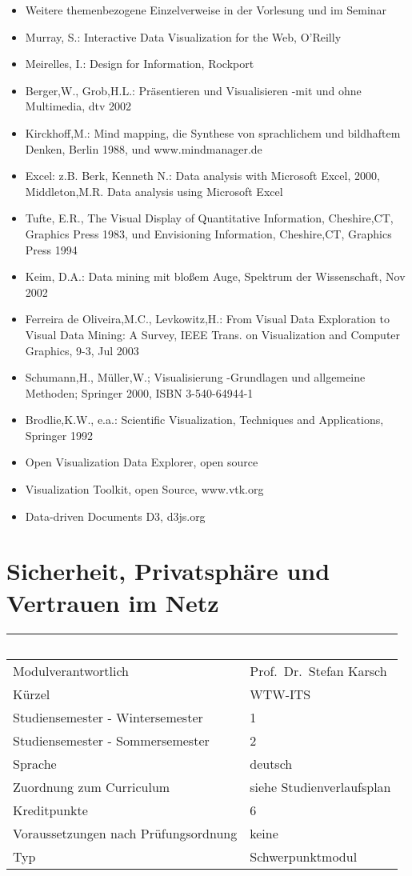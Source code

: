 \begin{itemize}
\item
  Weitere themenbezogene Einzelverweise in der Vorlesung und im Seminar
\item
  Murray, S.: Interactive Data Visualization for the Web, O'Reilly
\item
  Meirelles, I.: Design for Information, Rockport
\item
  Berger,W., Grob,H.L.: Präsentieren und Visualisieren -mit und ohne
  Multimedia, dtv 2002
\item
  Kirckhoff,M.: Mind mapping, die Synthese von sprachlichem und
  bildhaftem Denken, Berlin 1988, und www.mindmanager.de
\item
  Excel: z.B. Berk, Kenneth N.: Data analysis with Microsoft Excel,
  2000, Middleton,M.R. Data analysis using Microsoft Excel
\item
  Tufte, E.R., The Visual Display of Quantitative Information,
  Cheshire,CT, Graphics Press 1983, und Envisioning Information,
  Cheshire,CT, Graphics Press 1994
\item
  Keim, D.A.: Data mining mit bloßem Auge, Spektrum der Wissenschaft,
  Nov 2002
\item
  Ferreira de Oliveira,M.C., Levkowitz,H.: From Visual Data Exploration
  to Visual Data Mining: A Survey, IEEE Trans. on Visualization and
  Computer Graphics, 9-3, Jul 2003
\item
  Schumann,H., Müller,W.; Visualisierung -Grundlagen und allgemeine
  Methoden; Springer 2000, ISBN 3-540-64944-1
\item
  Brodlie,K.W., e.a.: Scientific Visualization, Techniques and
  Applications, Springer 1992
\item
  Open Visualization Data Explorer, open source
\item
  Visualization Toolkit, open Source, www.vtk.org
\item
  Data-driven Documents D3, d3js.org
\end{itemize}

\chapter{Sicherheit, Privatsphäre und Vertrauen im
Netz}\label{sicherheit-privatsphuxe4re-und-vertrauen-im-netz}

\begin{longtable}[]{@{}ll@{}}
\toprule
~ & ~\tabularnewline
\midrule
\endhead
Modulverantwortlich & Prof.~Dr.~Stefan Karsch\tabularnewline
Kürzel & WTW-ITS\tabularnewline
Studiensemester - Wintersemester & 1\tabularnewline
Studiensemester - Sommersemester & 2\tabularnewline
Sprache & deutsch\tabularnewline
Zuordnung zum Curriculum & siehe Studienverlaufsplan\tabularnewline
Kreditpunkte & 6\tabularnewline
Voraussetzungen nach Prüfungsordnung & keine\tabularnewline
Typ & Schwerpunktmodul\tabularnewline
\bottomrule
\end{longtable}

